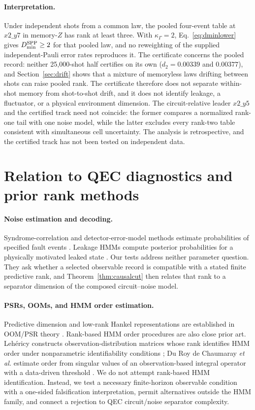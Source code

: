 \documentclass[11pt]{article}
\begin{document}
\paragraph{Interpretation.} Under independent shots from a common law, the pooled four-event table at $x2\_y7$ in memory-$Z$ has rank at least three. With $\kappa_\Gamma=2$, Eq.~\eqref{eq:dminlower} gives $D_{\min}^{\rm SPP}\ge2$ for that pooled law, and no reweighting of the supplied independent-Pauli error rates reproduces it. The certificate concerns the pooled record: neither 25,000-shot half certifies on its own ($d_2=0.00339$ and $0.00377$), and Section~\ref{sec:drift} shows that a mixture of memoryless laws drifting between shots can raise pooled rank. The certificate therefore does not separate within-shot memory from shot-to-shot drift, and it does not identify leakage, a fluctuator, or a physical environment dimension. The circuit-relative leader $x2\_y5$ and the certified track need not coincide: the former compares a normalized rank-one tail with one noise model, while the latter excludes every rank-two table consistent with simultaneous cell uncertainty. The analysis is retrospective, and the certified track has not been tested on independent data.

\FloatBarrier
\section{Relation to QEC diagnostics and prior rank methods}

\paragraph{Noise estimation and decoding.}
Syndrome-correlation and detector-error-model methods estimate probabilities of specified fault events \cite{wagner2021optimal,blumekohout2025dem}. Leakage HMMs compute posterior probabilities for a physically motivated leaked state \cite{varbanov2020leakage,bultink2020leakage}. Our tests address neither parameter question. They ask whether a selected observable record is compatible with a stated finite predictive rank, and Theorem~\ref{thm:causalcut} then relates that rank to a separator dimension of the composed circuit--noise model.

\paragraph{PSRs, OOMs, and HMM order estimation.}
Predictive dimension and low-rank Hankel representations are established in OOM/PSR theory \cite{jaeger2000oom,littman2001psr,singh2012psr}. Rank-based HMM order procedures are also close prior art. Leh\'ericy constructs observation-distribution matrices whose rank identifies HMM order under nonparametric identifiability conditions \cite{lehericy2019order}; Du Roy de Chaumaray \emph{et al.} estimate order from singular values of an observation-based integral operator with a data-driven threshold \cite{duroy2022order}. We do not attempt rank-based HMM identification. Instead, we test a necessary finite-horizon observable condition with a one-sided falsification interpretation, permit alternatives outside the HMM family, and connect a rejection to QEC circuit/noise separator complexity.
\end{document}

